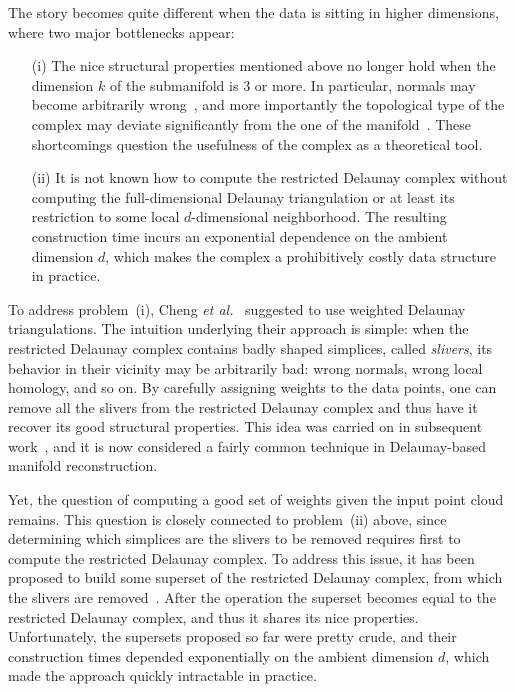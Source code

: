 The story becomes quite different when the data is sitting
in higher dimensions, where two major bottlenecks appear:
\begin{itemize}
\item[(i)] The nice structural properties mentioned above no longer
  hold when the dimension $k$ of the submanifold is $3$ or more. In
  particular, normals may become arbitrarily wrong~\cite{cdr-mr-05},
  and more importantly the topological type of the complex may deviate
  significantly from the one of the manifold~\cite{bgo-mrwc-09}. These
  shortcomings question the usefulness of the complex as a theoretical tool.
\item[(ii)] It is not known how to compute the restricted Delaunay
  complex without computing the full-dimensional Delaunay
  triangulation or at least its restriction to some local
  $d$-dimensional neighborhood. The resulting construction time incurs
  an exponential dependence on the ambient dimension $d$, which makes
  the complex a prohibitively costly data structure in practice.
\end{itemize}

To address problem~(i), Cheng {\em et al.}~\cite{cdr-mr-05} suggested
to use weighted Delaunay triangulations. The intuition underlying
their approach is simple: when the restricted Delaunay complex
contains badly shaped simplices, called {\em slivers}, its behavior in
their vicinity may be arbitrarily bad: wrong normals, wrong local homology,
and so on. By carefully assigning weights to the data points, one can remove
all the slivers from the restricted Delaunay complex and thus have it
recover its good structural properties. This idea was carried on in
subsequent work~\cite{bgo-mrwc-09,bg-mrtc-10}, and it is now
considered a fairly common technique in Delaunay-based manifold
reconstruction.

Yet, the question of computing a good set of weights given the input
point cloud remains. This question is closely connected to
problem~(ii) above, since determining which simplices are the slivers
to be removed requires first to compute the restricted Delaunay
complex. To address this issue, it has been proposed to build some
superset of the restricted Delaunay complex, from which the slivers
are removed~\cite{bgo-mrwc-09,cdr-mr-05}. After the operation the
superset becomes equal to the restricted Delaunay complex, and thus it
shares its nice properties. Unfortunately, the supersets proposed so
far were pretty crude, and their construction times
 depended exponentially on the ambient dimension
$d$, which made the approach quickly intractable in practice.

